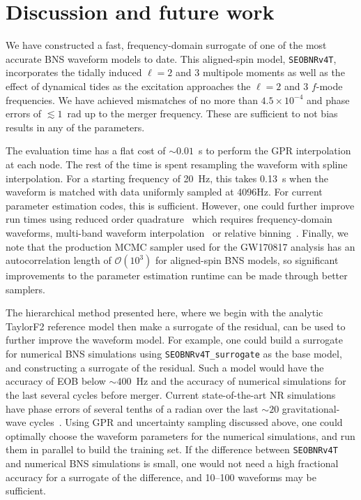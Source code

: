 \documentclass[prd,aps,letter,twocolumn,floatfix,notitlepage,nofootinbib]{revtex4-1}
\begin{document}
\section{Discussion and future work}
\label{sec:discussion}

We have constructed a fast, frequency-domain surrogate of one of the most accurate BNS waveform models to date. This aligned-spin model, \texttt{SEOBNRv4T}, incorporates the tidally induced $\ell=2$ and 3 multipole moments as well as the effect of dynamical tides as the excitation approaches the $\ell=2$ and 3 $f$-mode frequencies. We have achieved mismatches of no more than $4.5 \times 10^{-4}$ and phase errors of $\lesssim 1$~rad up to the merger frequency. These are sufficient to not bias results in any of the parameters.

The evaluation time has a flat cost of $\sim 0.01$~s to perform the GPR interpolation at each node. The rest of the time is spent resampling the waveform with spline interpolation. For a starting frequency of 20~Hz, this takes 0.13~s when the waveform is matched with data uniformly sampled at 4096Hz. For current parameter estimation codes, this is sufficient. However, one could further improve run times using reduced order quadrature~\cite{Antil2013, CanizaresFieldGair2013, CanizaresFieldGair2015, Smith:2016qas} which requires frequency-domain waveforms, multi-band waveform interpolation~\cite{VinciguerraVeitchMandel2017} or relative binning~\cite{Zackay:2018qdy}. Finally, we note that the production MCMC sampler used for the GW170817 analysis has an autocorrelation length of $\mathcal{O}(10^3)$ for aligned-spin BNS models, so significant improvements to the parameter estimation runtime can be made through better samplers. 

The hierarchical method presented here, where we begin with the analytic TaylorF2 reference model then make a surrogate of the residual, can be used to further improve the waveform model. For example, one could build a surrogate for numerical BNS simulations using \texttt{SEOBNRv4T\_surrogate} as the base model, and constructing a surrogate of the residual. Such a model would have the accuracy of EOB below $\sim 400$~Hz and the accuracy of numerical simulations for the last several cycles before merger. Current state-of-the-art NR simulations have phase errors of several tenths of a radian over the last $\sim 20$ gravitational-wave cycles~\cite{DietrichHinderer2017, KiuchiKawaguchiKyutoku2017}. Using GPR and uncertainty sampling discussed above, one could optimally choose the waveform parameters for the numerical simulations, and run them in parallel to build the training set. If the difference between \texttt{SEOBNRv4T} and numerical BNS simulations is small, one would not need a high fractional accuracy for a surrogate of the difference, and 10--100 waveforms may be sufficient.
\end{document}
